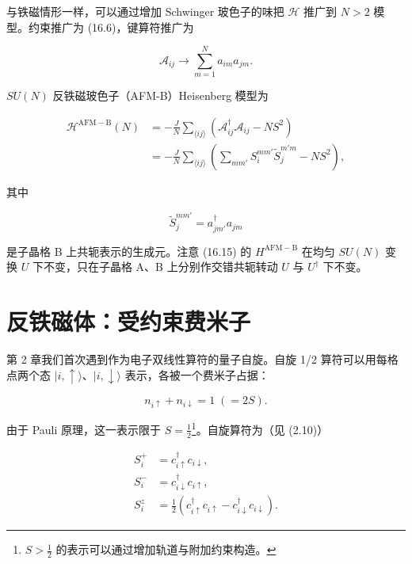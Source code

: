 与铁磁情形一样，可以通过增加 Schwinger 玻色子的味把 $\mathcal{H}$ 推广到 $N > 2$ 模型。约束推广为 (16.6)，键算符推广为

\begin{equation*}
\mathcal {A} _ {ij} \rightarrow \sum_ {m = 1} ^ {N} a _ {im} a _ {jm}.
\tag{16.14}
\end{equation*}

$SU(N)$ 反铁磁玻色子（AFM-B）Heisenberg 模型为

\begin{align*}
\mathcal {H} ^ {\mathrm{AFM-B}} ( N ) & = - \frac {J}{N} \sum_{\langle ij \rangle} \left( \mathcal {A} _ {ij} ^ {\dagger} \mathcal {A} _ {ij} - NS ^ {2} \right)\\
& = - \frac {J}{N} \sum_{\langle ij \rangle} \left( \sum_ {mm '} S _ {i} ^ {mm '} \tilde {S} _ {j} ^ {m'm} - NS ^ {2} \right) ,
\tag{16.15}
\end{align*}

其中

\begin{equation*}
\tilde {S} _ {j} ^ {mm '} = a _ {jm '} ^ {\dagger} a _ {jm}
\tag{16.16}
\end{equation*}

是子晶格 B 上共轭表示的生成元。注意 (16.15) 的 $H^{\mathrm{AFM-B}}$ 在均匀 $SU(N)$ 变换 $U$ 下不变，只在子晶格 A、B 上分别作交错共轭转动 $U$ 与 $U^{\dagger}$ 下不变。

\section{反铁磁体：受约束费米子}

第 2 章我们首次遇到作为电子双线性算符的量子自旋。自旋 1/2 算符可以用每格点两个态 $|i,\uparrow\rangle$、$|i,\downarrow\rangle$ 表示，各被一个费米子占据：

\begin{equation*}
n _ {i \uparrow} + n _ {i \downarrow} = 1 \; ( = 2 S ).
\tag{16.17}
\end{equation*}

由于 Pauli 原理，这一表示限于 $S = \frac{1}{2}$\footnote{$S > \frac{1}{2}$ 的表示可以通过增加轨道与附加约束构造。}。自旋算符为（见 (2.10)）

\begin{align*}
S _ {i} ^ {+} & = c _ {i \uparrow} ^ {\dagger} c _ {i \downarrow} ,\\
S _ {i} ^ {-} & = c _ {i \downarrow} ^ {\dagger} c _ {i \uparrow} ,\\
S _ {i} ^ {z} & = \frac {1}{2} \left( c _ {i \uparrow} ^ {\dagger} c _ {i \uparrow} - c _ {i \downarrow} ^ {\dagger} c _ {i \downarrow} \right) .
\tag{16.18}
\end{align*}

